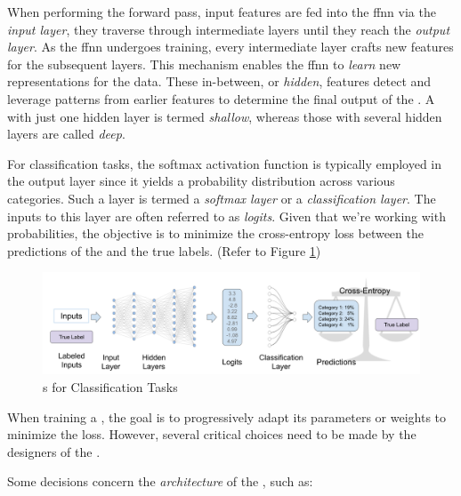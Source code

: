 When performing the forward pass, input features are fed into the \gls{ffnn} via the \emph{input layer}, they traverse through intermediate layers until they reach the \emph{output layer}.
As the \gls{ffnn} undergoes training, every intermediate layer crafts new features for the subsequent layers. 
This mechanism enables the \gls{ffnn} to \emph{learn} new representations for the data.
These in-between, or \emph{hidden}, features detect and leverage patterns from earlier features to determine the final output of the \neuralNetwork{}. A \neuralNetwork{} with just one hidden layer is termed \emph{shallow}, whereas those with several hidden layers are called \emph{deep}.

For classification tasks, the \gls{softmax} activation function is typically employed in the output layer since it yields a probability distribution across various categories. Such a layer is termed a \emph{\gls{softmax} layer} or a \emph{classification layer}. The inputs to this layer are often referred to as \emph{logits}. Given that we're working with probabilities, the objective is to minimize the cross-entropy loss between the predictions of the \neuralNetwork{} and the true labels.
(Refer to Figure \ref{fig:02_nn_nns_for_classification})

\begin{figure}
    \centering
    \includegraphics[width=\textwidth]{Figures/02/02_nns_for_classification.png}
    \caption{\neuralNetwork{}s for Classification Tasks}
    \label{fig:02_nn_nns_for_classification}
\end{figure}



\label{02_nn_hyperparameters}

When training a \neuralNetwork{}, the goal is to progressively adapt its parameters or weights to minimize the loss. However, several critical choices need to be made by the designers of the \neuralNetwork{}.

Some decisions concern the \emph{architecture} of the \neuralNetwork{}, such as:


